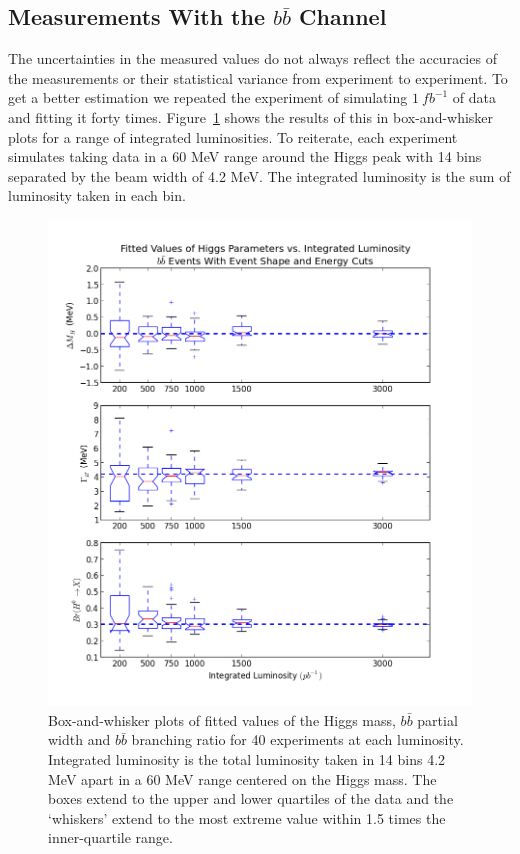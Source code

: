 \documentclass[a4paper]{article}
\begin{document}
\subsection{Measurements With the $b\bar{b}$ Channel}
The uncertainties in the measured values do not always reflect the accuracies of the measurements or their statistical variance from experiment to experiment. To get a better estimation we repeated the experiment of simulating $1~fb^{-1}$ of data and fitting it forty times. Figure~\ref{fig:fitted-vals-boxpl-bb} shows the results of this in box-and-whisker plots for a range of integrated luminosities. To reiterate, each experiment simulates taking data in a 60 MeV range around the Higgs peak with 14 bins separated by the beam width of 4.2 MeV. The integrated luminosity is the sum of luminosity taken in each bin. 

\begin{figure}
	\includegraphics[width=\textwidth]{fitted-vals-boxpl-bb}
	\caption{Box-and-whisker plots of fitted values of the Higgs mass, $b\bar{b}$ partial width and $b\bar{b}$ branching ratio for 40 experiments at each luminosity. Integrated luminosity is the total luminosity taken in 14 bins 4.2 MeV apart in a 60 MeV range centered on the Higgs mass. The boxes extend to the upper and lower quartiles of the data and the `whiskers' extend to the most extreme value within 1.5 times the inner-quartile range.\label{fig:fitted-vals-boxpl-bb}}
\end{figure}
\end{document}
